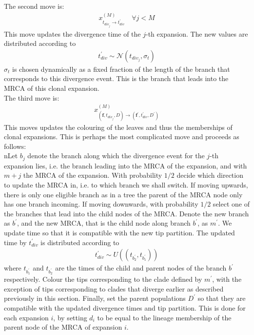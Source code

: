 \documentclass{report}
\theoremstyle{definition}
\begin{document}
The second move is:
\begin{gather}
x^{(M)}_{t_{div_j}\to t_{div}^{'}}\quad\forall j < M
\end{gather} 
This move updates the divergence time of the $j$-th expansion. The new values are distributed according to
\begin{gather}
t_{div}^{'}\sim\mathcal{N}(t_{div_j}, \sigma_t)
\end{gather}
$\sigma_t$ is chosen dynamically as a fixed fraction of the length of the branch that corresponds to this divergence event. This is the branch that leads into the MRCA of this clonal expansion.\\

The third move is:
\begin{gather}
x^{(M)}_{\left(\mathbf{f}, t_{div_j}, D\right)\to \left(\mathbf{f}^{'}, t_{div}^{'}, D^{'}\right)}
\end{gather} 
This moves updates the colouring of the leaves and thus the memberships of clonal expansions. This is perhaps the most complicated move and proceeds as follows: \\
nLet $b_j$ denote the branch along which the divergence event for the $j$-th expansion lies, i.e. the branch leading into the MRCA of the expansion, and with $m+j$ the MRCA of the expansion. With probability $1/2$ decide which direction to update the MRCA in, i.e. to which branch we shall switch. If moving upwards, there is only one eligible branch as in a tree the parent of the MRCA node only has one branch incoming. If moving downwards, with probability $1/2$ select one of the branches that lead into the child nodes of the MRCA. Denote the new branch as $b^{'}$, and the new MRCA, that is the child node along branch $b^{'}$, as $m^{'}$.
We update time so that it is compatible with the new tip partition. The updated time by $t_{div}^{'}$ is distributed according to
\begin{gather}
t_{div}^{'}\sim U((t_{b^{'}_2}, t_{b^{'}_1}))
\end{gather}
where $t_{b^{'}_1}$ and $t_{b^{'}_2}$ are the times of the child and parent nodes of the branch $b^{'}$ respectively. 
Colour the tips corresponding to the clade defined by $m^{'}$, with the exception of tips corresponding to clades that diverge earlier as described previously in this section.
Finally, set the parent populations $D^{'}$ so that they are compatible with the updated divergence times and tip partition. This is done for each expansion $i$, by setting $d_i$ to be equal to the lineage membership of the parent node of the MRCA of expansion $i$.\\
\end{document}
